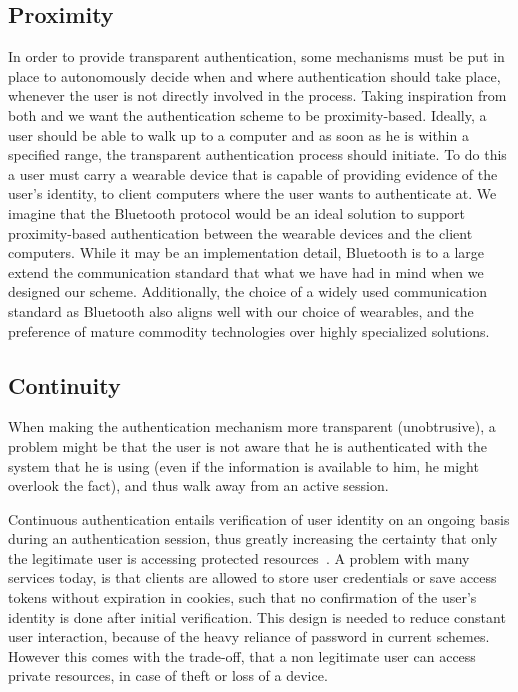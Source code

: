 \subsection{Proximity}
In order to provide transparent authentication, some mechanisms must be put in place to autonomously decide when and where authentication should take place, whenever the user is not directly involved in the process. Taking inspiration from both \citet{bardram2003context} and \citet{ojala2008wearable} we want the authentication scheme to be proximity-based. Ideally, a user should be able to walk up to a computer and as soon as he is within a specified range, the transparent authentication process should initiate. To do this a user must carry a wearable device that is capable of providing evidence of the user's identity, to client computers where the user wants to authenticate at. We imagine that the Bluetooth protocol would be an ideal solution to support proximity-based authentication between the wearable devices and the client computers. While it may be an implementation detail, Bluetooth is to a large extend the communication standard that what we have had in mind when we designed our scheme. Additionally, the choice of a widely used communication standard as Bluetooth also aligns well with our choice of wearables, and the preference of mature commodity technologies over highly specialized solutions.

\subsection{Continuity}

When making the authentication mechanism more transparent (unobtrusive), a problem might be that the user is not aware that he is authenticated with the system that he is using (even if the information is available to him, he might overlook the fact), and thus walk away from an active session. 


Continuous authentication entails verification of user identity on an ongoing basis during an authentication session, thus greatly increasing the certainty that only the legitimate user is accessing protected resources~\cite{ojala2008wearable}. A problem with many services today, is that clients are allowed to store user credentials or save access tokens without expiration in cookies, such that no confirmation of the user's identity is done after initial verification. This design is needed to reduce constant user interaction, because of the heavy reliance of password in current schemes. However this comes with the trade-off, that a non legitimate user can access private resources, in case of theft or loss of a device. 

